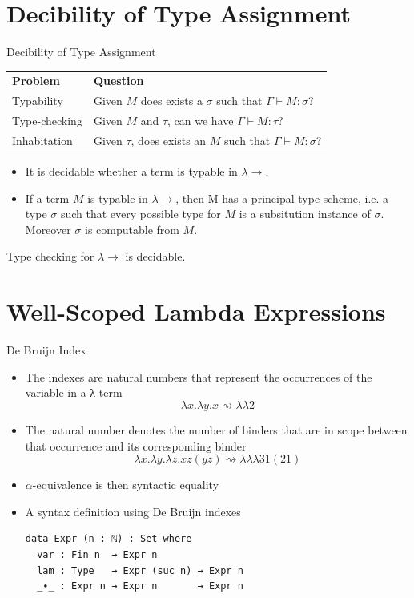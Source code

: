 \documentclass[10pt, xelatex, hyperref={pdfpagelabels=false,breaklinks}]{beamer}
\begin{document}
\section{Decibility of Type Assignment}
\begin{frame}{Decibility of Type Assignment~\citep{barendregt2013lambda}}

\begin{tabular}{ll}
{\color{blu} \textbf{Problem}} & {\color{blu} \textbf{Question}} \\
{\color{blu} Typability}       & Given $M$ does exists a $σ$ such that $Γ ⊢ M : σ$? \\
{\color{blu} Type-checking}    & Given $M$ and $τ$, can we have $Γ ⊢ M : τ$?  \\
{\color{blu} Inhabitation}     & Given $τ$, does exists an $M$ such that $Γ ⊢ M : σ$?\\
\end{tabular}

\begin{theorem}%
\begin{itemize}
\item It is decidable whether a term is typable in $\lambda\rightarrow$.
\item If a term $M$ is typable in $\lambda\rightarrow$, then M has a principal type scheme, i.e.
a type $σ$ such that every possible type for $M$ is a subsitution instance of $σ$.
Moreover $σ$ is computable from $M$.
\end{itemize}
\end{theorem}

\begin{theorem}%
Type checking for $\lambda\rightarrow$ is decidable.
\end{theorem}

\end{frame}

\section{Well-Scoped Lambda Expressions}
\begin{frame}[fragile]{De Bruijn Index}
\begin{itemize}
\item The indexes are natural numbers that represent the occurrences of the variable in a λ-term
$$  λx. λy. x ⇝  λ λ 2$$
\item The natural number denotes the number of binders that are in scope between that occurrence and its corresponding binder
$$λx. λy. λz. x z (y z)  ⇝ λ λ λ 3 1 (2 1)$$
\item $α$-equivalence is then syntactic equality
\item A syntax definition using De Bruijn indexes\\[3mm]
\begin{verbatim}
data Expr (n : ℕ) : Set where
  var : Fin n  → Expr n
  lam : Type   → Expr (suc n) → Expr n
  _∙_ : Expr n → Expr n       → Expr n
\end{verbatim}
\end{itemize}
\end{frame}
\end{document}
